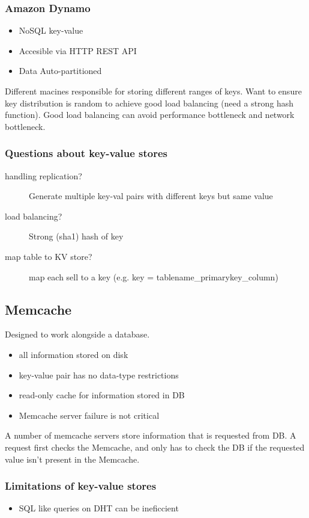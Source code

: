 \documentclass[12pt]{article}
\begin{document}
\subsubsection{Amazon Dynamo}
\begin{itemize}
  \item NoSQL key-value
  \item Accesible via HTTP REST API
  \item Data Auto-partitioned
\end{itemize}
Different macines responsible for storing different ranges of keys.
Want to ensure key distribution is random to achieve good load balancing (need
a strong hash function). Good load balancing can avoid performance bottleneck
and network bottleneck.

\subsubsection{Questions about key-value stores}
\begin{description}
  \item[handling replication?] Generate multiple key-val pairs with different
    keys but same value
  \item[load balancing?] Strong (sha1) hash of key
  \item[map table to KV store?] map each sell to a key (e.g. key =
    tablename\_primarykey\_column)
\end{description}

\subsection{Memcache}
Designed to work alongside a database.
\begin{itemize}
  \item all information stored on disk
  \item key-value pair has no data-type restrictions
  \item read-only cache for information stored in DB
  \item Memcache server failure is not critical
\end{itemize}
A number of memcache servers store information that is requested from DB. A
request first checks the Memcache, and only has to check the DB if the
requested value isn't present in the Memcache.

\subsubsection{Limitations of key-value stores}
\begin{itemize}
  \item SQL like queries on DHT can be ineficcient
\end{itemize}
\end{document}
